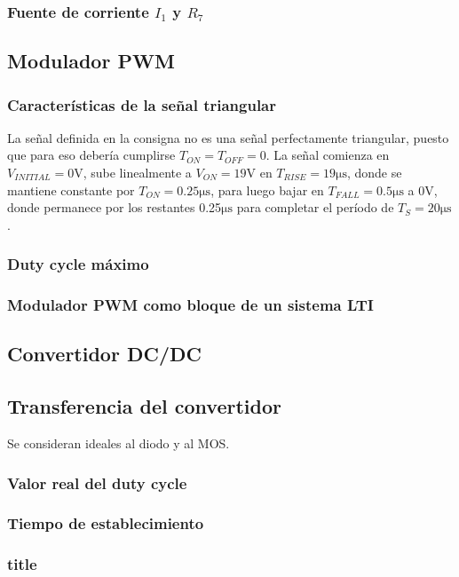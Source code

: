 \documentclass[e4-tp2-main.tex]{subfiles}
\begin{document}
\subsubsection{Fuente de corriente $I_1$ y $R_7$}



\subsection{Modulador PWM}
\subsubsection{Caracter\'isticas de la se\~nal triangular}
La se\~nal definida en la consigna no es una se\~nal perfectamente triangular, puesto que para eso deber\'ia cumplirse $T_{ON}=T_{OFF}=0$. La se\~nal comienza en $V_{INITIAL}=0\si\volt$, sube linealmente a $V_{ON}=19$V en $T_{RISE}=19\si{\micro\s}$, donde se mantiene constante por $T_{ON}=0.25\si{\micro\s}$, para luego bajar en $T_{FALL}=0.5\si{\micro\s}$ a 0V, donde permanece por los restantes 0.25$\si{\micro\s}$ para completar el per\'iodo de $T_{S}=20\si{\micro\s}$.

 
\subsubsection{Duty cycle m\'aximo}

\subsubsection{Modulador PWM como bloque de un sistema LTI}



\subsection{Convertidor DC/DC}
\subsection{Transferencia del convertidor}
Se consideran ideales al diodo y al MOS.

\subsubsection{Valor real del duty cycle}


\subsubsection{Tiempo de establecimiento}


\subsubsection{title}
\end{document}
